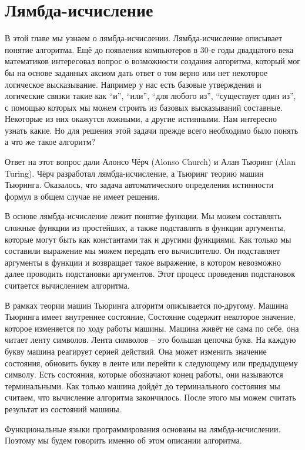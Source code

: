 \chapter{Лямбда-исчисление}

В этой главе мы узнаем о лямбда-исчислении. Лямбда-исчисление описывает
понятие алгоритма. Ещё до появления компьютеров в 30-е годы двадцатого
века математиков интересовал вопрос о возможности создания алгоритма,
который мог бы на основе заданных аксиом дать ответ о том верно или нет
некоторое логическое высказывание. Например у нас есть базовые
утверждения и логические связки такие как ``и'', ``или'', ``для любого
из'', ``существует один из'', с помощью которых мы можем строить из
базовых высказываний составные. Некоторые из них окажутся ложными, а
другие истинными. Нам интересно узнать какие. Но для решения этой задачи
прежде всего необходимо было понять а что же такое алгоритм?

Ответ на этот вопрос дали Алонсо Чёрч (Alonso Church) и Алан Тьюринг
(Alan Turing). Чёрч разработал лямбда-исчисление, а Тьюринг теорию машин
Тьюринга. Оказалось, что задача автоматического определения истинности
формул в общем случае не имеет решения.

В основе лямбда-исчисление лежит понятие функции. Мы можем составлять
сложные функции из простейших, а также подставлять в функции аргументы,
которые могут быть как константами так и другими функциями. Как только
мы составили выражение мы можем передать его вычислителю. Он подставляет
аргументы в функции и возвращает такое выражение, в котором невозможно
далее проводить подстановки аргументов. Этот процесс проведения
подстановок считается вычислением алгоритма.

В рамках теории машин Тьюринга алгоритм описывается по-другому. Машина
Тьюринга имеет внутреннее состояние, Состояние содержит некоторое
значение, которое изменяется по ходу работы машины. Машина живёт не сама
по себе, она читает ленту символов. Лента символов -- это большая
цепочка букв. На каждую букву машина реагирует серией действий. Она
может изменить значение состояния, обновить букву в ленте или перейти к
следующему или предыдущему символу. Есть состояния, которые обозначают
конец работы, они называются терминальными. Как только машина дойдёт до
терминального состояния мы считаем, что вычисление алгоритма
закончилось. После этого мы можем считать результат из состояний машины.

Функциональные языки программирования основаны на лямбда-исчислении.
Поэтому мы будем говорить именно об этом описании алгоритма.

